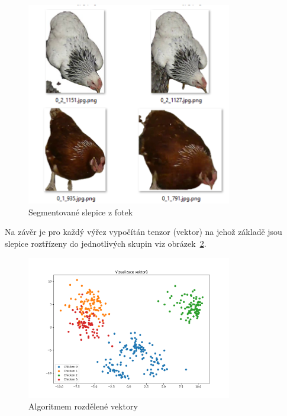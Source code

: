 \begin{figure}[H]
    \centering
    \includegraphics[width=0.8\textwidth]{img/segmented_chicks}
    \caption{Segmentované slepice z fotek}
    \label{fig:segmented_chicks2}
\end{figure}

Na závěr je pro každý výřez vypočítán tenzor (vektor) na jehož základě jsou slepice roztřízeny do jednotlivých skupin viz obrázek~\ref{fig:chicks_in_clusters}.

\begin{figure}[H]
    \centering
    \includegraphics[width=0.8\textwidth]{img/chicks_in_clusters}
    \caption{Algoritmem rozdělené vektory}
    \label{fig:chicks_in_clusters}
\end{figure}

